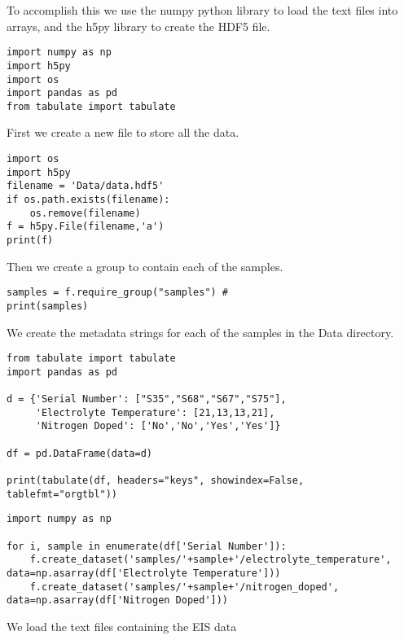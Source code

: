 \documentclass[11pt]{article}
\begin{document}
To accomplish this we use the numpy python library to load the text files into arrays, and the h5py library to create the HDF5 file.

\begin{verbatim}
import numpy as np
import h5py
import os
import pandas as pd
from tabulate import tabulate
\end{verbatim}

First we create a new file to store all the data.

\begin{verbatim}
import os
import h5py
filename = 'Data/data.hdf5'
if os.path.exists(filename):
    os.remove(filename)
f = h5py.File(filename,'a')
print(f)
\end{verbatim}

Then we create a group to contain each of the samples.

\begin{verbatim}
samples = f.require_group("samples") #
print(samples)
\end{verbatim}

We create the metadata strings for each of the samples in the Data directory.

\begin{verbatim}
from tabulate import tabulate
import pandas as pd

d = {'Serial Number': ["S35","S68","S67","S75"],
     'Electrolyte Temperature': [21,13,13,21],
     'Nitrogen Doped': ['No','No','Yes','Yes']}

df = pd.DataFrame(data=d)

print(tabulate(df, headers="keys", showindex=False, tablefmt="orgtbl"))

\end{verbatim}

\begin{verbatim}
import numpy as np

for i, sample in enumerate(df['Serial Number']):
    f.create_dataset('samples/'+sample+'/electrolyte_temperature', data=np.asarray(df['Electrolyte Temperature']))
    f.create_dataset('samples/'+sample+'/nitrogen_doped', data=np.asarray(df['Nitrogen Doped']))
\end{verbatim}

We load the text files containing the EIS data
\end{document}
